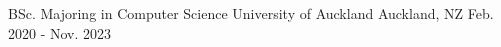 

\begin{cventries}

  \cventry
    {BSc. Majoring in Computer Science} %
    {University of Auckland} %
    {Auckland, NZ} %
    {Feb. 2020 - Nov. 2023} %
    {
      \begin{cvitems} %
      \end{cvitems}
    }
    
\end{cventries}
